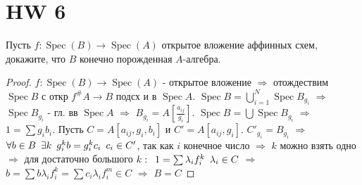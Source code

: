 \section{HW 6}

\begin{prob}
Пусть $f: \operatorname{Spec}(B) \rightarrow \operatorname{Spec}(A)$ открытое вложение аффинных схем, докажите, что $B$ конечно порожденная $A$-алгебра.
\end{prob}
\begin{proof}
$f: \operatorname{Spec}(B) \rightarrow \operatorname{Spec}(A)$ - открытое вложение $\Rightarrow$ отождествим $\operatorname{Spec} B$ с откр $f^{\#} A \rightarrow B$ подсх и в $\operatorname{Spec} A$. $\operatorname{Spec} B = \bigcup_{i = 1}^{N} \operatorname{Spec} B_{g_i}$ $\Rightarrow$ $\operatorname{Spec} B_{g_i}$ - гл. вв $\operatorname{Spec} A$ $\Rightarrow$ $B_{g_i} = A \left[\frac{a_{ij}}{g_{i}}\right]$. $\operatorname{Spec} B = \bigcup \operatorname{Spec} B_{g_i}$ $\Rightarrow$ $1 = \sum g_i b_i$. Пусть $C = A[a_{ij}, g_i, b_i]$ и $C' = A[a_{ij}, g_i]$. $C'_{g_i} = B_{g_i}$ $\Rightarrow$ $\forall b \in B\hspace{0.5em} \exists k\hspace{0.5em} g_i^k b = g_i^k c_i\hspace{0.5em} c_i \in C'$, так как $i$ конечное число $\Rightarrow$ $k$ можно взять одно $\Rightarrow$ для достаточно большого $k:\hspace{0.5em} 1 = \sum \lambda_i f_i^k\hspace{0.5em} \lambda_i \in C$ $\Rightarrow$ $b = \sum b \lambda_i f_i^k = \sum c_i \lambda_i f_i^m \in C$ $\Rightarrow$ $B = C$
\end{proof}
\begin{comment}
\end{comment}
\vskip 0.6in





